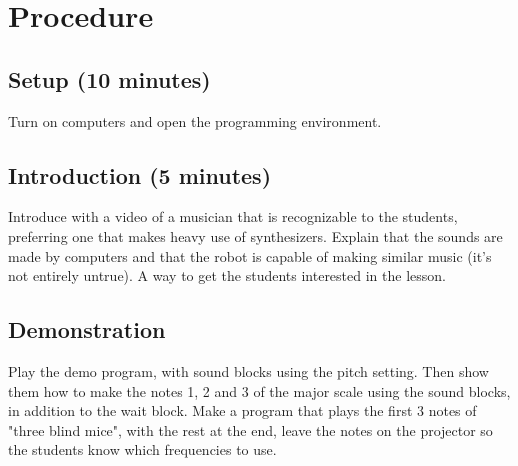 \documentclass{lessonplan}
\begin{document}
  \section{Procedure}
    \subsection{Setup (10 minutes)}
      Turn on computers and open the programming environment.


    \subsection{Introduction (5 minutes)}
      Introduce with a video of a musician that is recognizable to the
      students, preferring one that makes heavy use of synthesizers.
      Explain that the sounds are made by computers and that the robot
      is capable of making similar music (it's not entirely untrue).
      A way to get the students interested in the lesson.
      
    \subsection{Demonstration}
      Play the demo program, with sound blocks using the pitch
      setting.  Then show them how to make the notes 1, 2 and 3 of the
      major scale using the sound blocks, in addition to the wait
      block.  Make a program that plays the first 3 notes of "three
      blind mice", with the rest at the end, leave the notes on the
      projector so the students know which frequencies to use.
      
\end{document}
